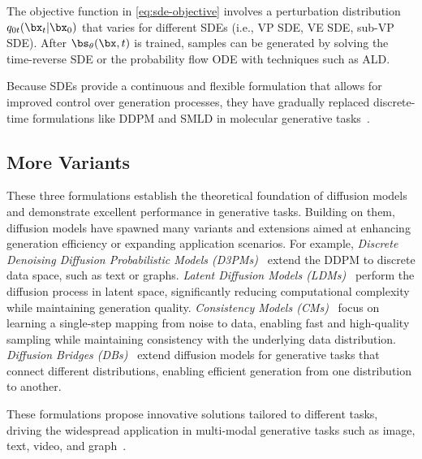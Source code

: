 The objective function in \cref{eq:sde-objective} involves a perturbation distribution $q_{0t}(\bx_t | \bx_0)$ that varies for
different SDEs (i.e., VP SDE, VE SDE, sub-VP SDE). 
After $\bs_\theta(\bx, t)$ is trained, samples can be generated by solving the time-reverse SDE or the probability flow ODE with techniques such as ALD.

Because SDEs provide a continuous and flexible formulation that allows for improved control over generation processes, they have gradually replaced discrete-time formulations like DDPM and SMLD in molecular generative tasks~\citep{GDSS,EEGSDE,JODO}.


\subsection{More Variants}

These three formulations establish the theoretical foundation of diffusion models and demonstrate excellent performance in generative tasks. Building on them, diffusion models have spawned many variants and extensions aimed at enhancing generation efficiency or expanding application scenarios.
For example, 
\textit{Discrete Denoising Diffusion Probabilistic Models (D3PMs)}~\citep{D3PM} extend the DDPM to discrete data space, such as text or graphs. 
\textit{Latent Diffusion Models (LDMs)}~\citep{LDM} perform the diffusion process in latent space, significantly reducing computational complexity while maintaining generation quality.
\textit{Consistency Models (CMs)}~\citep{ConsistencyModel} focus on learning a single-step mapping from noise to data, enabling fast and high-quality sampling while maintaining consistency with the underlying data distribution.
\textit{Diffusion Bridges (DBs)}~\citep{DSB,SB-FBSDE,DDBM} extend diffusion models for generative tasks that connect different distributions, enabling efficient generation from one distribution to another.

These formulations propose innovative solutions tailored to different tasks, driving the widespread application in multi-modal generative tasks such as image, text, video, and graph~\citep{DiffusionSurvey1,DiffusionGraphSurvey1,DiffusionGraphSurvey2}.